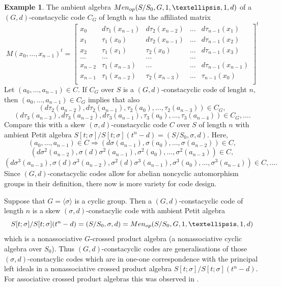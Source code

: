 \documentclass[11pt]{amsart}
\theoremstyle{plain}
\theoremstyle{definition}
\newtheorem{example}[theorem]{Example}
\begin{document}
 \begin{example}\label{ex:cyclic}
 The ambient  algebra ${\rm Men}_{op}(S/S_0, G, 1,\dots,1,d)$ of a $(G,d)$-constacyclic code $C_G$ of length $n$ has the affiliated matrix
  \[ M(x_0,\dots,x_{n-1})^t=\left [\begin {array}{ccccccc}
x_0 &  d\tau_1(x_{n-1}) & d \tau_2(x_{n-2}) &... & d \tau_{n-1}(x_{1})\\
x_1 & \tau_1(x_0) & d \tau_2(x_{n-1})&... &  d \tau_{n-1}(x_{2})\\
x_2 & \tau_1(x_{1}) & \tau_2(x_0) & ... & d \tau_{n-1}(x_{3})\\
...& ...  & ... & ...\\
x_{n-2} &  \tau_1(x_{n-3})  & ...& ...& d \tau_{n-1}(x_{n-1})\\
x_{n-1} &  \tau_1(x_{n-2}) &    \tau_2(x_{n-3})  & ...& \tau_{n-1}(x_{0})\\
\end {array}\right ]^t
 \]
  Let $(a_0,\dots,a_{n-1})\in  C$. If $C_G$ over $S$ is a
   $(G,d)$-constacyclic code of lenght $n$, then $(a_0,\dots,a_{n-1})\in  C_G$ implies that also
  $$( d \tau_2(a_{n-2}), d \tau_2(a_{n-1}),\tau_2(a_0),\dots,\tau_2(a_{n-3}))\in C_G,$$
   $$( d \tau_3(a_{n-3}),  d \tau_3(a_{n-2}), d \tau_3(a_{n-1}),\tau_3(a_0),\dots,\tau_3(a_{n-4}))\in  C_G,\dots.$$
Compare this with a skew $(\sigma,d)$-constacyclic code $C$ over $S$ of length $n$ with ambient Petit algebra $S[t;\sigma]/S[t;\sigma](t^n-d)=(S/S_0,\sigma, d)$.  Here,
$$(a_0,\dots,a_{n-1})\in C \Rightarrow  ( d \sigma(a_{n-1}),\sigma(a_0),\dots,\sigma(a_{n-2}))\in  C,$$
  $$ ( d \sigma^2(a_{n-2}), \sigma(d) \sigma^2(a_{n-1}),\sigma^2(a_0),\dots,\sigma^2(a_{n-3}))\in  C,$$
  $$ ( d  \sigma^3(a_{n-3}), \sigma(d)\sigma^3(a_{n-2}), \sigma^2(d) \sigma^3(a_{n-1}),\sigma^3(a_0),\dots,\sigma^3(a_{n-4}))\in  C,\dots.$$
  Since  $(G,d)$-constacyclic codes allow for abelian noncyclic automorphism groups in their definition, there now is more variety for code design.

  Suppose that $G=\langle \sigma \rangle$ is a cyclic group. Then a $(G,d)$-constacyclic code of length $n$ is a skew $(\sigma,d)$-constacylic code  with ambient Petit algebra
  $$S[t;\sigma]/S[t;\sigma](t^n-d)=(S/S_0, \sigma, d)={\rm Men}_{op}(S/S_0, G, 1,\dots,1,d)$$
  which is a nonassociative $G$-crossed product algebra (a nonassociative cyclic algebra over $S_0$).
   Thus $(G,d)$-constacyclic codes are generalisations of those $(\sigma,d)$-constacylic codes which are in one-one correspondence with the principal left ideals in a nonassociative crossed product algebra $S[t;\sigma]/S[t;\sigma](t^n-d)$. For associative crossed product algebras this was observed in \cite{GM}.
\end{example}
\end{document}
